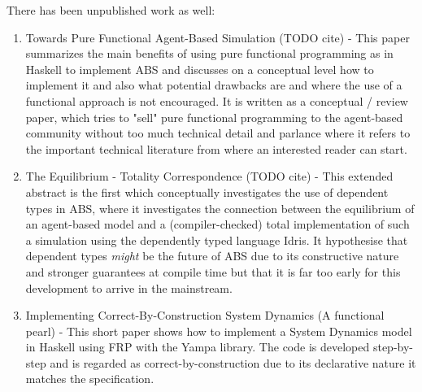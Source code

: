There has been unpublished work as well:

\begin{enumerate}
	\item Towards Pure Functional Agent-Based Simulation (TODO cite) - This paper summarizes the main benefits of using pure functional programming as in Haskell to implement ABS and discusses on a conceptual level how to implement it and also what potential drawbacks are and where the use of a functional approach is not encouraged. It is written as a conceptual / review paper, which tries to "sell" pure functional programming to the agent-based community without too much technical detail and parlance where it refers to the important technical literature from where an interested reader can start.

	\item The Equilibrium - Totality Correspondence (TODO cite) - This extended abstract is the first which conceptually investigates the use of dependent types in ABS, where it investigates the connection between the equilibrium of an agent-based model and a (compiler-checked) total implementation of such a simulation using the dependently typed language Idris. It hypothesise that dependent types \textit{might} be the future of ABS due to its constructive nature and stronger guarantees at compile time but that it is far too early for this development to arrive in the mainstream.

	\item Implementing Correct-By-Construction System Dynamics (A functional pearl) - This short paper shows how to implement a System Dynamics model in Haskell using FRP with the Yampa library. The code is developed step-by-step and is regarded as correct-by-construction due to its declarative nature it matches the specification. 
\end{enumerate}

